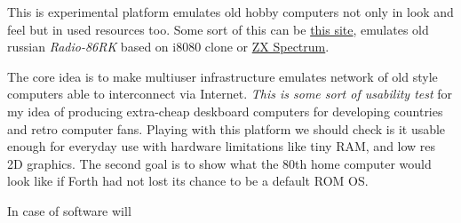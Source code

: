 \clearpage{}\label{uweb}

This is experimental platform emulates old hobby computers not only in look and
feel but in used resources too. Some sort of this can be
\href{http://rk86.ru/}{this site}, emulates old russian \emph{Radio-86RK} based
on i8080 clone or \href{http://jsspeccy.zxdemo.org}{ZX Spectrum}.

The core idea is to make multiuser infrastructure emulates network of old style computers able to interconnect via
Internet. \emph{This is some sort of usability test} for my idea of producing
extra-cheap deskboard computers for developing countries and retro computer
fans. Playing with this platform we should check is it usable enough for
everyday use with hardware limitations like tiny RAM, and low res 2D graphics.
The second goal is to show what the 80th home computer would look like if Forth
had not lost its chance to be a default ROM OS.

In case of software will
